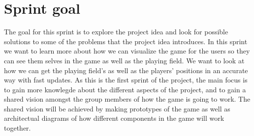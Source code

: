 \section{Sprint goal}
The goal for this sprint is to explore the project idea and look for possible solutions to some of the problems that the project idea introduces.
In this sprint we want to learn more about how we can visualize the game for the users so they can see them selves in the game as well as the playing field.
We want to look at how we can get the playing field's as well as the players' positions in an accurate way with fast updates.
As this is the first sprint of the project, the main focus is to gain more knowlegde about the different aspects of the project, and to gain a shared vision amongst the group members of how the game is going to work.
The shared vision will be achieved by making prototypes of the game as well as architectual diagrams of how different components in the game will work together.